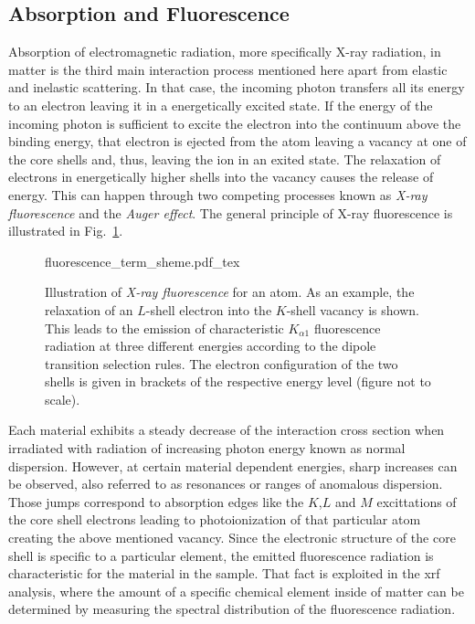 \subsection{Absorption and Fluorescence} \label{ch_theo:sec_absorption_and_fluorescence}
Absorption of electromagnetic radiation, more specifically X-ray radiation, in matter is the third main interaction process mentioned here apart from elastic and inelastic scattering. In that case, the incoming photon transfers all its energy to an electron leaving it in a energetically excited state. If the energy of the incoming photon is sufficient to excite the electron into the continuum above the binding energy, that electron is ejected from the atom leaving a vacancy at one of the core shells and, thus, leaving the ion in an exited state. The relaxation of electrons in energetically higher shells into the vacancy causes the release of energy. This can happen through two competing processes known as \emph{X-ray fluorescence} and the \emph{Auger effect}. The general principle of X-ray fluorescence is illustrated in Fig.~\ref{ch_theo:fig_fluorescence_term_sheme}.
\begin{figure}[htb]
    \def\svgwidth{0.5\textwidth}
    {fluorescence_term_sheme.pdf_tex}
    \caption[Illustration of \emph{X-ray fluorescence} for an atom.]{Illustration of \emph{X-ray fluorescence} for an atom. As an example, the relaxation of an $L$-shell electron into the $K$-shell vacancy is shown. This leads to the emission of characteristic $K_{\alpha 1}$ fluorescence radiation at three different energies according to the dipole transition selection rules. The electron configuration of the two shells is given in brackets of the respective energy level (figure not to scale).}
    \label{ch_theo:fig_fluorescence_term_sheme}
\end{figure}

Each material exhibits a steady decrease of the interaction cross section when irradiated with radiation of increasing photon energy known as normal dispersion. However, at certain material dependent energies, sharp increases can be observed, also referred to as resonances or ranges of anomalous dispersion. Those jumps correspond to absorption edges like the $K$,$L$ and $M$ excittations of the core shell electrons leading to photoionization of that particular atom creating the above mentioned vacancy. Since the electronic structure of the core shell is specific to a particular element, the emitted fluorescence radiation is characteristic for the material in the sample. That fact is exploited in the \gls{xrf} analysis, where the amount of a specific chemical element inside of matter can be determined by measuring the spectral distribution of the fluorescence radiation.

